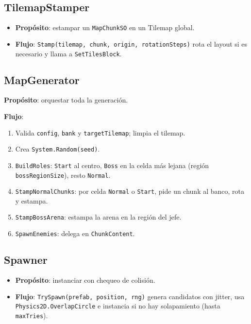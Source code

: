 \documentclass[a4paper,12pt]{article}
\begin{document}
\subsection{TilemapStamper}

\begin{itemize}
    \item \textbf{Propósito}: estampar un \texttt{MapChunkSO} en un Tilemap global.
    \item \textbf{Flujo}: \texttt{Stamp(tilemap, chunk, origin, rotationSteps)} rota el layout si es necesario y llama a \texttt{SetTilesBlock}.
\end{itemize}

\subsection{MapGenerator}

\textbf{Propósito}: orquestar toda la generación.

\textbf{Flujo}:

\begin{enumerate}
    \item Valida \texttt{config}, \texttt{bank} y \texttt{targetTilemap}; limpia el tilemap.
    \item Crea \texttt{System.Random(seed)}.
    \item \texttt{BuildRoles}: \texttt{Start} al centro, \texttt{Boss} en la celda más lejana (región \texttt{bossRegionSize}), resto \texttt{Normal}.
    \item \texttt{StampNormalChunks}: por celda \texttt{Normal} o \texttt{Start}, pide un chunk al banco, rota y estampa.
    \item \texttt{StampBossArena}: estampa la arena en la región del jefe.
    \item \texttt{SpawnEnemies}: delega en \texttt{ChunkContent}.
\end{enumerate}

\subsection{Spawner}

\begin{itemize}
    \item \textbf{Propósito}: instanciar con chequeo de colisión.
    \item \textbf{Flujo}: \texttt{TrySpawn(prefab, position, rng)} genera candidatos con jitter, usa \texttt{Physics2D.OverlapCircle} e instancia si no hay solapamiento (hasta \texttt{maxTries}).
\end{itemize}
\end{document}
